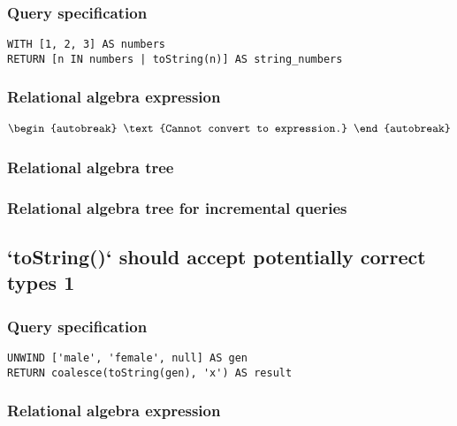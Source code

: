 \subsubsection*{Query specification}

\begin{lstlisting}
WITH [1, 2, 3] AS numbers
RETURN [n IN numbers | toString(n)] AS string_numbers
\end{lstlisting}

\subsubsection*{Relational algebra expression}

\begin{align*}
\begin{autobreak}
\text{Cannot convert to expression.}
\end{autobreak}
\end{align*}

\subsubsection*{Relational algebra tree}


\subsubsection*{Relational algebra tree for incremental queries}


\subsection{`toString()` should accept potentially correct types 1}

\subsubsection*{Query specification}

\begin{lstlisting}
UNWIND ['male', 'female', null] AS gen
RETURN coalesce(toString(gen), 'x') AS result
\end{lstlisting}

\subsubsection*{Relational algebra expression}

